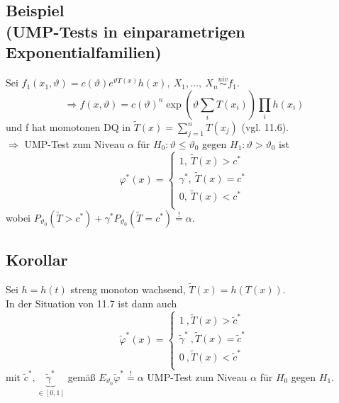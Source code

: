 \documentclass[a4paper,11pt,twoside,titlepage]{article}
\newcommand{\uiv}{\ensuremath{\stackrel{uiv}{\sim}}}
\begin{document}
\subsection{Beispiel\\(UMP-Tests in einparametrigen Exponentialfamilien)}
Sei $f_1(x_1,\vartheta)=c(\vartheta)e^{\vartheta T(x)}h(x),\ X_1,\ldots,\ X_n\uiv f_1$.
$$\Rightarrow f(x,\vartheta)=c(\vartheta)^n\exp(\vartheta\sum_iT(x_i))\prod_ih(x_i)$$ und
f hat momotonen DQ in $\tilde T(x)=\sum_{j=1}^nT(x_j)$ (vgl. 11.6).\\
$\Rightarrow$ UMP-Test zum Niveau $\alpha$ für
$H_0:\vartheta\leq\vartheta_0$ gegen $H_1:\vartheta>\vartheta_0$ ist
$$\varphi^\ast(x)=\left\{
\begin{matrix}1,\ \tilde T(x)>c^\ast\\\gamma^\ast,\ \tilde T(x)=c^\ast\\0,\ \tilde T(x)<c^\ast\\\end{matrix}\right.$$
wobei $P_{\vartheta_0}(\widetilde{T}>c^\ast)+\gamma^\ast P_{\vartheta_0}(\widetilde{T}=c^\ast)
\stackrel{!}{=}\alpha$.

\subsection{Korollar}
Sei $h=h(t)$ streng monoton wachsend, $\widetilde{T}(x)=h(T(x))$.\\
In der Situation von 11.7 ist dann auch
$$\tilde\varphi^\ast(x)=\left\{
\begin{matrix}1\ ,\widetilde{T}(x)>\widetilde{c}^\ast\\\tilde\gamma^\ast\ ,\widetilde{T}(x)=\widetilde{c}^\ast\\0\ ,\widetilde{T}(x)<\widetilde{c}^\ast\\\end{matrix}\right.$$
mit $\tilde c^\ast,\underbrace{\tilde \gamma^\ast}_{\in[0,1]}$ gemäß $E_{\vartheta_0}\widetilde{\varphi}^\ast\stackrel{!}{=}\alpha$ UMP-Test zum Niveau $\alpha$ für $H_0$ gegen $H_1$.

\cleardoublepage
\end{document}
